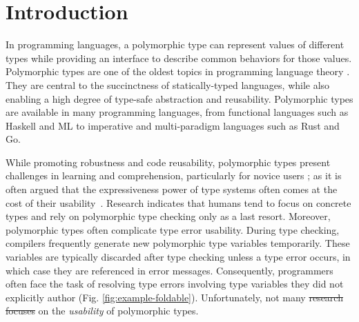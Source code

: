 \documentclass[preprint,12pt]{elsarticle}
\makeatletter
\providecommand{\DIFadd}[1]{{\protect\color{blue}\uwave{#1}}} %
\providecommand{\DIFdel}[1]{{\protect\color{red}\sout{#1}}} %
\providecommand{\DIFaddbegin}{} %
\providecommand{\DIFaddend}{} %
\providecommand{\DIFdelbegin}{} %
\providecommand{\DIFdelend}{} %
\let\sout@orig\sout %
\renewcommand{\sout}[1]{\ifmmode\text{\sout@orig{\ensuremath{#1}}}\else\sout@orig{#1}\fi} %
\makeatother
\begin{document}
\linenumbers

\section{Introduction} \label{sec:intro}
In programming languages, a polymorphic type \cite{Cardelli1987-fp} can represent values of different types while providing an interface to describe common behaviors for those values. Polymorphic types are one of the oldest topics in programming language theory \cite{Cardelli1987-fp}. They are central to the succinctness of statically-typed languages, while also enabling a high degree of type-safe abstraction and reusability. Polymorphic types are available in many programming languages, from functional languages such as Haskell and ML to imperative and multi-paradigm languages such as Rust\cite{Klabnik_undated-wx} and Go\cite{Griesemer_undated-ff}.


While promoting robustness and code reusability, polymorphic types present challenges in learning and comprehension, particularly for novice users \cite{Jun2000-ec, Jun2000-yu}; as it is often argued that the expressiveness power of type systems often comes at the cost of their usability~\cite{Hage2020-hg}. Research indicates that humans tend to focus on concrete types and rely on polymorphic type checking only as a last resort. Moreover, polymorphic types often complicate type error usability. During type checking, compilers frequently generate new polymorphic type variables temporarily. These variables are typically discarded after type checking unless a type error occurs, in which case they are referenced in error messages. Consequently, programmers often face the task of resolving type errors involving type variables they did not explicitly author (Fig. \ref{fig:example-foldable}). Unfortunately, not many \DIFdelbegin \DIFdel{research focuses }\DIFdelend \DIFaddbegin \DIFadd{studies focus }\DIFaddend on the \textit{usability} of polymorphic types. 
\end{document}
